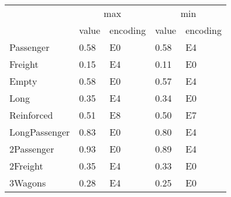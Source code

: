 \begin{tabular}{lllll}
\toprule
 & \multicolumn{2}{c}{max} & \multicolumn{2}{c}{min} \\
 & value & encoding & value & encoding \\
\midrule
Passenger & 0.58 & E0 & 0.58 & E4 \\
Freight & 0.15 & E4 & 0.11 & E0 \\
Empty & 0.58 & E0 & 0.57 & E4 \\
Long & 0.35 & E4 & 0.34 & E0 \\
Reinforced & 0.51 & E8 & 0.50 & E7 \\
LongPassenger & 0.83 & E0 & 0.80 & E4 \\
2Passenger & 0.93 & E0 & 0.89 & E4 \\
2Freight & 0.35 & E4 & 0.33 & E0 \\
3Wagons & 0.28 & E4 & 0.25 & E0 \\
\bottomrule
\end{tabular}
